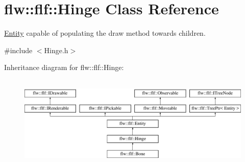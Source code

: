 \hypertarget{classflw_1_1flf_1_1Hinge}{}\section{flw\+:\+:flf\+:\+:Hinge Class Reference}
\label{classflw_1_1flf_1_1Hinge}


\hyperlink{classflw_1_1flf_1_1Entity}{Entity} capable of populating the draw method towards children.  




{\ttfamily \#include $<$Hinge.\+h$>$}

Inheritance diagram for flw\+:\+:flf\+:\+:Hinge\+:\begin{figure}[H]
\begin{center}
\leavevmode
\includegraphics[height=4.487180cm]{classflw_1_1flf_1_1Hinge}
\end{center}
\end{figure}
